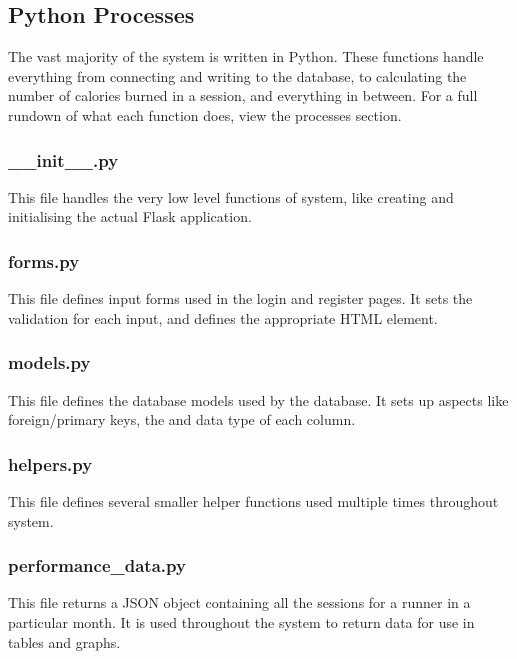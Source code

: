 \documentclass{article}[12pt,a4paper]
\begin{document}


\subsection{Python Processes}
The vast majority of the system is written in Python. These functions handle everything from connecting and writing to the database, to calculating the number of calories burned in a session, and everything in between. For a full rundown of what each function does, view the processes section.

\subsubsection{\_\_init\_\_.py}
This file handles the very low level functions of system, like creating and initialising the actual Flask application.


\subsubsection{forms.py}
This file defines input forms used in the login and register pages. It sets the validation for each input, and defines the appropriate HTML element.


\subsubsection{models.py}
This file defines the database models used by the database. It sets up aspects like foreign/primary keys, the and data type of each column.


\subsubsection{helpers.py}
This file defines several smaller helper functions used multiple times throughout system.


\subsubsection{performance\_data.py}
This file returns a JSON object containing all the sessions for a runner in a particular month. It is used throughout the system to return data for use in tables and graphs.

\end{document}
